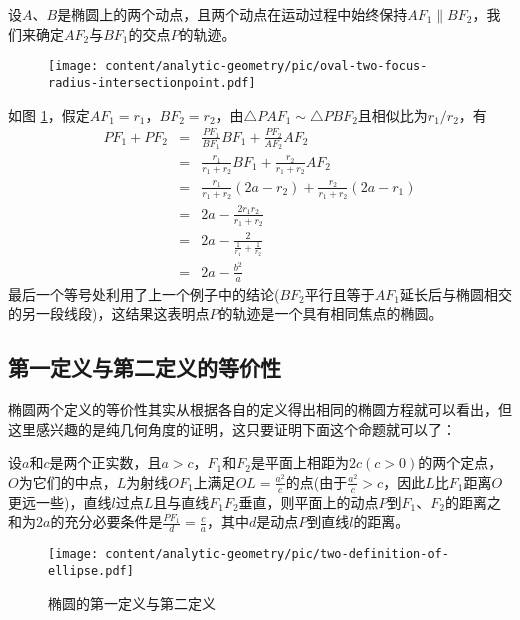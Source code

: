 \begin{example}
设$A$、$B$是椭圆上的两个动点，且两个动点在运动过程中始终保持$AF_1 \parallel BF_2$，我们来确定$AF_2$与$BF_1$的交点$P$的轨迹。

\begin{figure}[htbp]
  \centering
\texttt{[image: content/analytic-geometry/pic/oval-two-focus-radius-intersectionpoint.pdf]}
\caption{}
\label{fig:oval-two-focus-radius-intersectionpoint}
\end{figure}

如图 \ref{fig:oval-two-focus-radius-intersectionpoint}，假定$AF_1=r_1$，$BF_2=r_2$，由$\triangle PAF_1 \sim \triangle PBF_2$且相似比为$r_1/r_2$，有
\begin{eqnarray*}
  PF_1 + PF_2 & = & \frac{PF_1}{BF_1}BF_1 + \frac{PF_2}{AF_2}AF_2 \\
              & = & \frac{r_1}{r_1+r_2}BF_1 + \frac{r_2}{r_1+r_2}AF_2 \\
              & = & \frac{r_1}{r_1+r_2}(2a-r_2) + \frac{r_2}{r_1+r_2}(2a-r_1) \\
              & = & 2a - \frac{2r_1r_2}{r_1+r_2} \\
              & = & 2a - \frac{2}{\frac{1}{r_1}+\frac{1}{r_2}} \\
  & = & 2a - \frac{b^2}{a}
\end{eqnarray*}
最后一个等号处利用了上一个例子中的结论($BF_2$平行且等于$AF_1$延长后与椭圆相交的另一段线段)，这结果这表明点$P$的轨迹是一个具有相同焦点的椭圆。
\end{example}

\subsection{第一定义与第二定义的等价性}
\label{sec:the-equalance-for-two-definition-of-oval}

椭圆两个定义的等价性其实从根据各自的定义得出相同的椭圆方程就可以看出，但这里感兴趣的是纯几何角度的证明，这只要证明下面这个命题就可以了：
\begin{statement}
设$a$和$c$是两个正实数，且$a>c$，$F_1$和$F_2$是平面上相距为$2c(c>0)$的两个定点，$O$为它们的中点，$L$为射线$OF_1$上满足$OL=\frac{a^2}{c}$的点(由于$\frac{a^2}{c}>c$，因此$L$比$F_1$距离$O$更远一些)，直线$l$过点$L$且与直线$F_1F_2$垂直，则平面上的动点$P$到$F_1$、$F_2$的距离之和为$2a$的充分必要条件是$\frac{PF_1}{d}=\frac{c}{a}$，其中$d$是动点$P$到直线$l$的距离。
\end{statement}

\begin{figure}[htbp]
  \centering
\texttt{[image: content/analytic-geometry/pic/two-definition-of-ellipse.pdf]}
\caption{椭圆的第一定义与第二定义}
\label{fig:two-definition-of-ellipse}
\end{figure}

